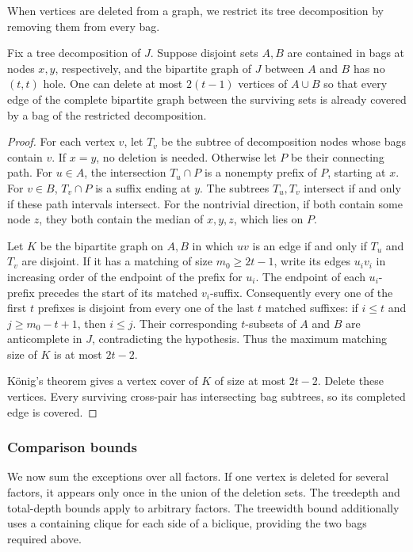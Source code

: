 When vertices are deleted from a graph, we restrict its tree
decomposition by removing them from every bag.

\begin{lemma}
\label{lem:tw-biclique-completion}
Fix a tree decomposition of $J$. Suppose disjoint sets $A,B$
are contained in bags at nodes $x,y$, respectively, and the
bipartite graph of $J$ between $A$ and $B$ has no $(t,t)$ hole.
One can delete at most $2(t-1)$ vertices of $A\cup B$ so that
every edge of the complete bipartite graph between the surviving
sets is already covered by a bag of the restricted decomposition.
\end{lemma}

\begin{proof}
For each vertex $v$, let $T_v$ be the subtree of decomposition
nodes whose bags contain $v$.
If $x=y$, no deletion is needed. Otherwise let $P$ be their
connecting path. For $u\in A$, the intersection $T_u\cap P$
is a nonempty prefix of $P$, starting at $x$. For $v\in B$,
$T_v\cap P$ is a suffix ending at $y$.
The subtrees $T_u,T_v$ intersect if and only if these path
intervals intersect. For the nontrivial direction, if both
contain some node $z$, they both contain the median of $x,y,z$,
which lies on $P$.

Let $K$ be the bipartite graph on $A,B$ in which $uv$ is an edge
if and only if $T_u$ and $T_v$ are disjoint.
If it has a matching of size $m_0\ge2t-1$, write its edges
$u_iv_i$ in increasing order of the endpoint of the prefix for
$u_i$. The endpoint of each $u_i$-prefix precedes the start
of its matched $v_i$-suffix. Consequently every one of the first
$t$ prefixes is disjoint from every one of the last $t$ matched
suffixes: if $i\le t$ and $j\ge m_0-t+1$, then $i\le j$.
Their corresponding $t$-subsets of $A$ and $B$ are anticomplete
in $J$, contradicting the hypothesis. Thus the maximum matching size
of $K$ is at most $2t-2$.

K\"onig's theorem gives a vertex cover of $K$ of size at most
$2t-2$. Delete these vertices. Every surviving cross-pair has
intersecting bag subtrees, so its completed edge is covered.
\end{proof}

\subsubsection{Comparison bounds}

We now sum the exceptions over all factors. If one vertex is deleted
for several factors, it appears only once in the union of the deletion
sets. The treedepth and total-depth bounds apply to
arbitrary factors. The treewidth bound additionally uses a containing clique
for each side of a biclique, providing the two bags required above.

